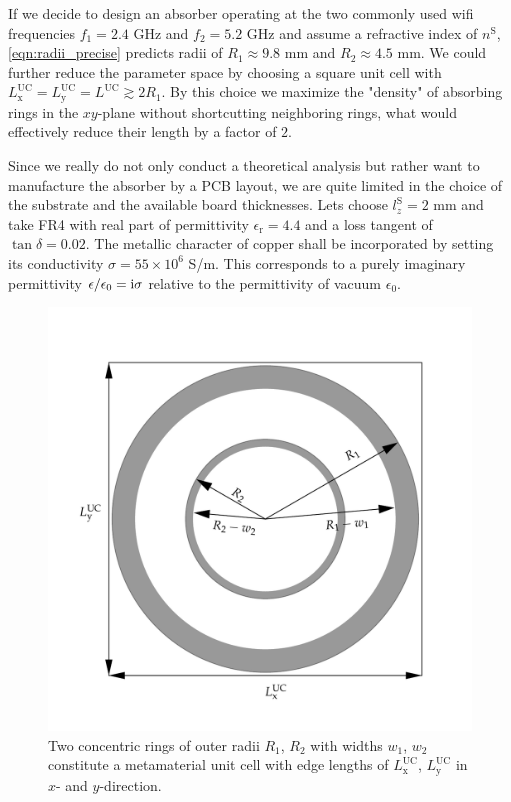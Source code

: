 If we decide to design an absorber operating at the two commonly used wifi frequencies $f_1=2.4$ GHz and $f_2=5.2$ GHz and assume a refractive index of $n^\mathrm{S}$, \cref{eqn:radii_precise} predicts radii of $R_1\approx9.8$ mm and $R_2\approx 4.5$ mm. We could further reduce the parameter space by choosing a square unit cell with $L^\mathrm{UC}_\mathrm{x}=L^\mathrm{UC}_\mathrm{y}=L^\mathrm{UC}\gtrsim 2R_1$. By this choice we maximize the "density" of absorbing rings in the $xy$-plane without shortcutting neighboring rings, what would effectively reduce their length by a factor of $2$.

Since we really do not only conduct a theoretical analysis but rather want to manufacture the absorber by a PCB layout, we are quite limited in the choice of the substrate and the available board thicknesses. Lets choose $l_z^\mathrm{S}=2$ mm and take FR4 with real part of permittivity $\epsilon_\mathrm{r}=4.4$ and a loss tangent of $\tan \delta=0.02$. The metallic character of copper shall be incorporated by setting its conductivity $\sigma=55\times 10^6$ S/m. This corresponds to a purely imaginary permittivity $\epsilon/\epsilon_0 = \mathrm{i} \sigma$ relative to the permittivity of vacuum $\epsilon_0$.

\begin{figure}
\centering
\includegraphics[width=0.75\linewidth]{./media/double_ring_sketch.pdf}
\caption{Two concentric rings of outer radii $R_1$, $R_2$ with widths $w_1$, $w_2$ constitute a metamaterial unit cell with edge lengths of $L_\mathrm{x}^\mathrm{UC}$, $L_\mathrm{y}^\mathrm{UC}$ in $x$- and $y$-direction.}
\label{fig:double_ring_sketch}
\end{figure}

